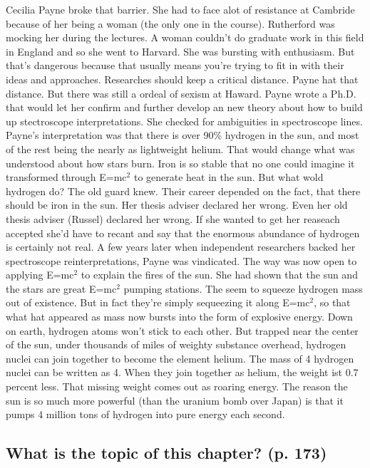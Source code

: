 Cecilia Payne broke that barrier. She had to face alot of resistance at Cambride because of her being a woman (the only one in the course). Rutherford was mocking her during the lectures. A woman couldn't do graduate work in this field in England and so she went to Harvard. She was bursting with enthusiasm. But that's dangerous because that usually means you're trying to fit in with their ideas and approaches. Researches should keep a critical distance. Payne hat that distance. But there was still a ordeal of sexism at Haward. 
Payne wrote a Ph.D. that would let her confirm and further develop an new theory about how to build up stectroscope interpretations.
She checked for ambiguities in spectroscope lines.
Payne's interpretation was that there is over 90\% hydrogen in the sun, and most of the rest being the nearly as lightweight helium.
That would change what was understood about how stars burn. Iron is so stable that no one could imagine it transformed through E=mc$^2$ to generate heat in the sun. But what wold hydrogen do? The old guard knew. Their career depended on the fact, that there should be iron in the sun. Her thesis adviser declared her wrong. Even her old thesis adviser (Russel) declared her wrong. If she wanted to get her reaseach accepted she'd have to recant and say that the enormous abundance of hydrogen is certainly not real. A few years later when independent researchers backed her spectroscope reinterpretations, Payne was vindicated.
The way was now open to applying E=mc$^2$ to explain the fires of the sun. She had shown that the sun and the stars are great E=mc$^2$ pumping stations. The seem to squeeze hydrogen mass out of existence. But in fact they're simply sequeezing it along E=mc$^2$, so that what hat appeared as mass now bursts into the form of explosive energy.
Down on earth, hydrogen atoms won't stick to each other. But trapped near the center of the sun, under thousands of miles of weighty substance overhead, hydrogen nuclei can join together to become the element helium.
The mass of 4 hydrogen nuclei can be written as 4. When they join together as
helium, the weight ist 0.7 percent less. That missing weight comes out as roaring energy. The reason the sun is so much more powerful (than the uranium bomb over Japan) is that it pumps 4 million tons of hydrogen into pure energy each second.


\subsection*{What is the topic of this chapter? (p. 173)}

